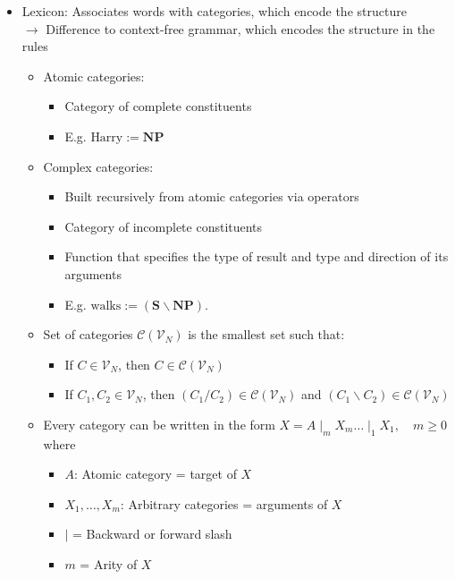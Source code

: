 \begin{itemize}
    \item Lexicon: Associates words with categories, which encode the structure\\
    $\rightarrow$ Difference to context-free grammar, which encodes the structure in the rules
    \begin{itemize}
        \item Atomic categories: 
        \begin{itemize}
            \item Category of complete constituents
            \item E.g. $\textrm{Harry} := \boldsymbol{NP}$
        \end{itemize}
        \item Complex categories:
        \begin{itemize}
             \item Built recursively from atomic categories via operators
            \item Category of incomplete constituents
            \item Function that specifies the type of result and type and direction of its arguments
            \item E.g. $\textrm{walks} := (\textbf{S} \backslash \textbf{NP})$.
        \end{itemize}
        \item Set of categories $\mathcal{C}(\mathcal{V}_N)$ is the smallest set such that:
        \begin{itemize}
            \item If $C \in \mathcal{V}_N$, then $C \in \mathcal{C}(\mathcal{V}_N)$
            \item If $C_1, C_2 \in \mathcal{V}_N$, then $(C_1 / C_2) \in \mathcal{C}(\mathcal{V}_N)$ and $(C_1 \backslash C_2) \in \mathcal{C}(\mathcal{V}_N)$
        \end{itemize}
        \item Every category can be written in the form $X = A \mid_m X_m \dots \mid_1 X_1, \quad m \geq 0$ where
        \begin{itemize}
            \item $A$: Atomic category = target of $X$
            \item $X_1, \dots, X_m$: Arbitrary categories = arguments of $X$
            \item $\mid$ = Backward or forward slash
            \item $m$ = Arity of $X$

\end{itemize}
\end{itemize}
\end{itemize}
